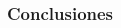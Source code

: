 \documentclass[14pt]{beamer}
\begin{document}
\begin{frame}
\frametitle{Conclusiones}
\begin{itemize}
\begin{columns}
\begin{column}{0.5\textwidth}

\begin{center}



\end{center}
\end{column}
\end{columns}
\end{itemize}
\end{frame}
\end{document}
